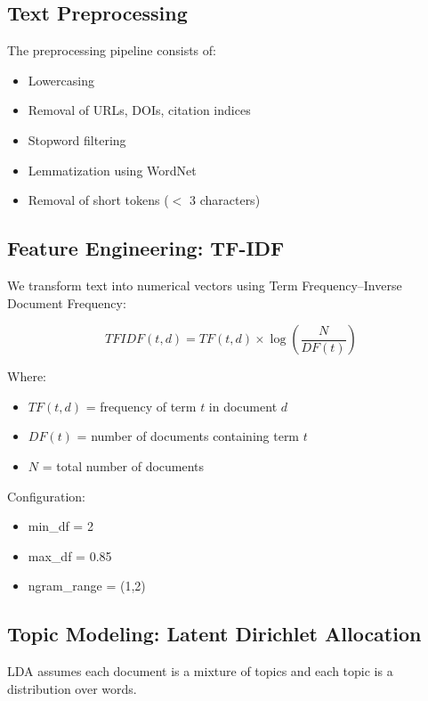 \documentclass[12pt]{article}
\begin{document}
\subsection{Text Preprocessing}

The preprocessing pipeline consists of:
\begin{itemize}
    \item Lowercasing
    \item Removal of URLs, DOIs, citation indices
    \item Stopword filtering
    \item Lemmatization using WordNet
    \item Removal of short tokens ($<$ 3 characters)
\end{itemize}

\subsection{Feature Engineering: TF-IDF}

We transform text into numerical vectors using Term Frequency–Inverse Document Frequency:

\begin{equation}
TFIDF(t, d) = TF(t, d) \times \log\left(\frac{N}{DF(t)}\right)
\end{equation}

Where:
\begin{itemize}
    \item $TF(t, d)$ = frequency of term $t$ in document $d$
    \item $DF(t)$ = number of documents containing term $t$
    \item $N$ = total number of documents
\end{itemize}

Configuration:
\begin{itemize}
    \item min\_df = 2
    \item max\_df = 0.85
    \item ngram\_range = (1,2)
\end{itemize}

\subsection{Topic Modeling: Latent Dirichlet Allocation}

LDA assumes each document is a mixture of topics and each topic is a distribution over words.
\end{document}
